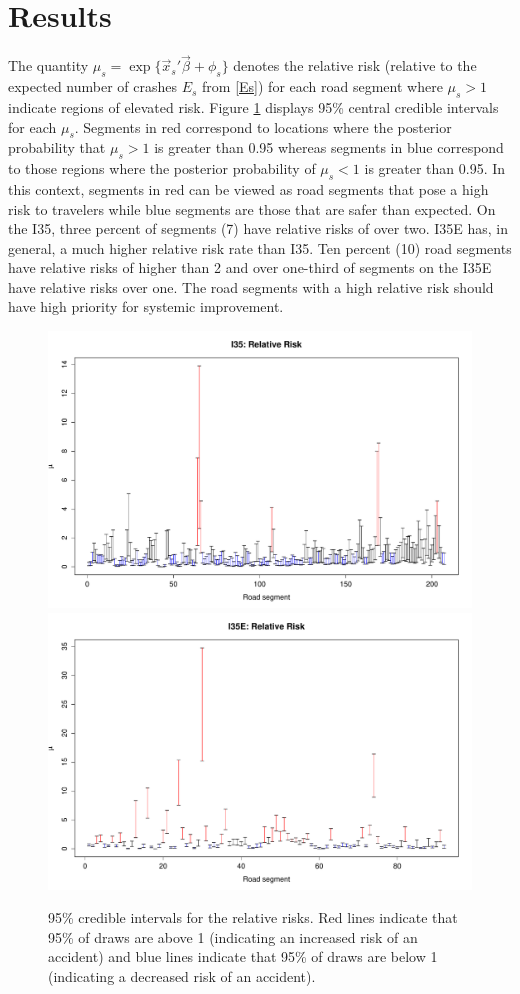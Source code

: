\section{Results}
The quantity $\mu_s=\exp\{\vec{x}_s'\vec{\beta} + \phi_s\}$ denotes the relative risk (relative to the expected number of crashes $E_s$ from \eqref{Es}) for each road segment where $\mu_s >1$ indicate regions of elevated risk. Figure \ref{relrisk} displays 95\% central credible intervals for each $\mu_s$.  Segments in red correspond to locations where the posterior probability that $\mu_s > 1$ is greater than 0.95 whereas segments in blue correspond to those regions where the posterior probability of $\mu_s < 1$ is greater than 0.95.  In this context, segments in red can be viewed as road segments that pose a high risk to travelers while blue segments are those that are safer than expected. On the I35, three percent of segments (7) have relative risks of over two. I35E has, in general, a much higher relative risk rate than I35. Ten percent (10) road segments have relative risks of higher than 2  and over one-third of segments on the I35E have relative risks over one.  The road segments with a high relative risk should have high priority for systemic improvement.  
\begin{figure}[tb] 
\centering
\includegraphics[width=.9\textwidth]{relrisk.pdf}
\includegraphics[width=.9\textwidth]{i35erelrisk.pdf}
\caption{95\% credible intervals for the relative risks. Red lines indicate that 95\% of  draws are above 1 (indicating an increased risk of an accident) and blue lines indicate that 95\% of draws are below 1 (indicating a decreased risk of an accident). }
\label{relrisk}
\end{figure}


